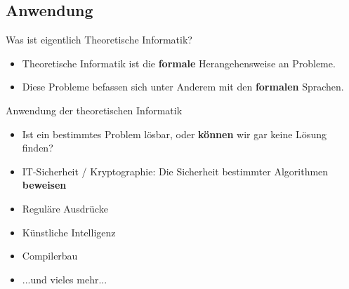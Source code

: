 %
%
%
%

\subsection{Anwendung}
\begin{frame}[fragile]{Was ist eigentlich Theoretische Informatik?}
    \begin{itemize} 
    \item Theoretische Informatik ist die \textbf{formale} Herangehensweise an Probleme.\\
    \item Diese Probleme befassen sich unter Anderem mit den \textbf{formalen} Sprachen.
    \end{itemize}
\end{frame}

\begin{frame}{Anwendung der theoretischen Informatik}
    \begin{itemize}
        \item Ist ein bestimmtes Problem lösbar, oder \textbf{können} wir gar keine Lösung finden?
        \item IT-Sicherheit / Kryptographie: Die Sicherheit bestimmter Algorithmen \textbf{beweisen}
        \item Reguläre Ausdrücke
        \item Künstliche Intelligenz
        \item Compilerbau
        \item ...und vieles mehr...
    \end{itemize}
\end{frame}

